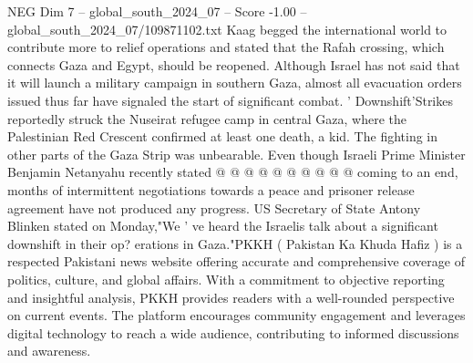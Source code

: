 \begin{textsample}{NEG Dim 7 – global\_south\_2024\_07 – Score -1.00 – global\_south\_2024\_07/109871102.txt}
Kaag begged the international world to contribute more to relief operations and stated that the Rafah crossing, which connects Gaza and Egypt, should be reopened.
Although Israel has not said that it will launch a military campaign in southern Gaza, almost all evacuation orders issued thus far have signaled the start of significant combat. ' Downshift'Strikes reportedly struck the Nuseirat refugee camp in central Gaza, where the Palestinian Red Crescent confirmed at least one death, a kid.
The fighting in other parts of the Gaza Strip was unbearable.
Even though Israeli Prime Minister Benjamin Netanyahu recently stated @ @ @ @ @ @ @ @ @ @ coming to an end, months of intermittent negotiations towards a peace and prisoner release agreement have not produced any progress.
US Secretary of State Antony Blinken stated on Monday,"We ' ve heard the Israelis talk about a significant downshift in their op? erations in Gaza."PKKH ( Pakistan Ka Khuda Hafiz ) is a respected Pakistani news website offering accurate and comprehensive coverage of politics, culture, and global affairs.
With a commitment to objective reporting and insightful analysis, PKKH provides readers with a well-rounded perspective on current events.
The platform encourages community engagement and leverages digital technology to reach a wide audience, contributing to informed discussions and awareness.

\end{textsample}
